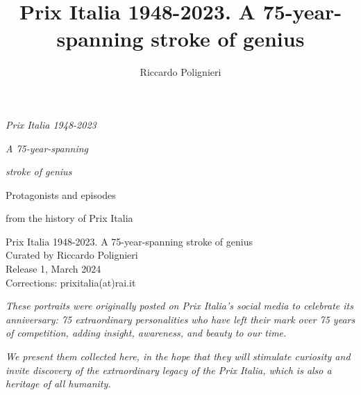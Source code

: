 \documentclass[11pt, oneside]{book}
\title{Prix Italia 1948-2023. A 75-year-spanning stroke of genius}
\author{Riccardo Polignieri}
\date{}
\begin{document}

\thispagestyle{empty}

\newpage\thispagestyle{empty} %
\null\vfill

\newpage\thispagestyle{empty}
\setcounter{page}{1} %
\null\vspace{150pt}
\hfill{\LARGE\slshape Prix Italia 1948-2023}

\bigskip

\hfill{\LARGE\slshape A 75-year-spanning}

\hfill{\LARGE\slshape stroke of genius}

\bigskip
\bigskip

\hfill{\large Protagonists and episodes}

\hfill{\large from the history of Prix Italia}

\vfill

\newpage\thispagestyle{empty}
\null\vfill
{\footnotesize\ttfamily\noindent Prix Italia 1948-2023. A 75-year-spanning stroke of genius\\Curated by Riccardo Polignieri\\Release 1, March 2024\\Corrections: prixitalia(at)rai.it}

\newpage
\null\vspace{150pt}

{\noindent\large\slshape These portraits were originally posted on Prix Italia's social media to celebrate its anniversary: 75 extraordinary personalities who have left their mark over 75 years of competition, adding insight, awareness, and beauty to our time.}

{\noindent\large\slshape We present them collected here, in the hope that they will stimulate curiosity and invite discovery of the extraordinary legacy of the Prix Italia, which is also a heritage of all humanity.}
 
\vfill

\newpage
\end{document}

